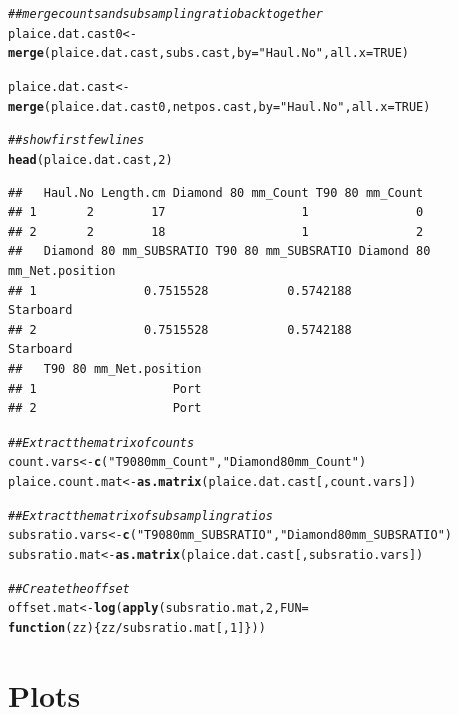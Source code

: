 \documentclass[12pt]{article}\usepackage[]{graphicx}\usepackage[]{color}
\makeatletter
\newcommand{\hlnum}[1]{\textcolor[rgb]{0.686,0.059,0.569}{#1}}%
\newcommand{\hlstr}[1]{\textcolor[rgb]{0.192,0.494,0.8}{#1}}%
\newcommand{\hlcom}[1]{\textcolor[rgb]{0.678,0.584,0.686}{\textit{#1}}}%
\newcommand{\hlopt}[1]{\textcolor[rgb]{0,0,0}{#1}}%
\newcommand{\hlstd}[1]{\textcolor[rgb]{0.345,0.345,0.345}{#1}}%
\newcommand{\hlkwa}[1]{\textcolor[rgb]{0.161,0.373,0.58}{\textbf{#1}}}%
\newcommand{\hlkwb}[1]{\textcolor[rgb]{0.69,0.353,0.396}{#1}}%
\newcommand{\hlkwc}[1]{\textcolor[rgb]{0.333,0.667,0.333}{#1}}%
\newcommand{\hlkwd}[1]{\textcolor[rgb]{0.737,0.353,0.396}{\textbf{#1}}}%
\newenvironment{kframe}{%
 \def\at@end@of@kframe{}%
 \ifinner\ifhmode%
  \def\at@end@of@kframe{\end{minipage}}%
  \begin{minipage}{\columnwidth}%
 \fi\fi%
 \def\FrameCommand##1{\hskip\@totalleftmargin \hskip-\fboxsep
 \colorbox{shadecolor}{##1}\hskip-\fboxsep
     \hskip-\linewidth \hskip-\@totalleftmargin \hskip\columnwidth}%
 \MakeFramed {\advance\hsize-\width
   \@totalleftmargin\z@ \linewidth\hsize
   \@setminipage}}%
 {\par\unskip\endMakeFramed%
 \at@end@of@kframe}
\newenvironment{knitrout}{}{} %
\makeatother
\begin{document}
\begin{knitrout}
\begin{kframe}
\begin{alltt}
\hlcom{## merge counts and subsampling ratio back together }
\hlstd{plaice.dat.cast0} \hlkwb{<-} \hlkwd{merge}\hlstd{(plaice.dat.cast, subs.cast,} \hlkwc{by} \hlstd{=} \hlstr{"Haul.No"}\hlstd{,} \hlkwc{all.x} \hlstd{=} \hlnum{TRUE}\hlstd{)}

\hlstd{plaice.dat.cast} \hlkwb{<-} \hlkwd{merge}\hlstd{(plaice.dat.cast0, netpos.cast,} \hlkwc{by} \hlstd{=} \hlstr{"Haul.No"}\hlstd{,} \hlkwc{all.x} \hlstd{=} \hlnum{TRUE}\hlstd{)}

\hlcom{## show first few lines}
\hlkwd{head}\hlstd{(plaice.dat.cast,} \hlnum{2}\hlstd{)}
\end{alltt}
\begin{verbatim}
##   Haul.No Length.cm Diamond 80 mm_Count T90 80 mm_Count
## 1       2        17                   1               0
## 2       2        18                   1               2
##   Diamond 80 mm_SUBSRATIO T90 80 mm_SUBSRATIO Diamond 80 mm_Net.position
## 1               0.7515528           0.5742188                  Starboard
## 2               0.7515528           0.5742188                  Starboard
##   T90 80 mm_Net.position
## 1                   Port
## 2                   Port
\end{verbatim}
\begin{alltt}
\hlcom{## Extract the matrix of counts}
\hlstd{count.vars} \hlkwb{<-} \hlkwd{c}\hlstd{(}\hlstr{"T90 80 mm_Count"}\hlstd{,} \hlstr{"Diamond 80 mm_Count"}\hlstd{)}
\hlstd{plaice.count.mat} \hlkwb{<-} \hlkwd{as.matrix}\hlstd{(plaice.dat.cast[, count.vars])}

\hlcom{## Extract the matrix of subsampling ratios}
\hlstd{subsratio.vars} \hlkwb{<-} \hlkwd{c}\hlstd{(}\hlstr{"T90 80 mm_SUBSRATIO"}\hlstd{,} \hlstr{"Diamond 80 mm_SUBSRATIO"}\hlstd{)}
\hlstd{subsratio.mat} \hlkwb{<-} \hlkwd{as.matrix}\hlstd{(plaice.dat.cast[, subsratio.vars])}

\hlcom{## Create the offset}
\hlstd{offset.mat} \hlkwb{<-} \hlkwd{log}\hlstd{(}\hlkwd{apply}\hlstd{(subsratio.mat,} \hlnum{2}\hlstd{,} \hlkwc{FUN} \hlstd{=}
                        \hlkwa{function}\hlstd{(}\hlkwc{zz}\hlstd{)\{zz}\hlopt{/}\hlstd{subsratio.mat[,}\hlnum{1}\hlstd{]\}))}
\end{alltt}
\end{kframe}
\end{knitrout}

\section{Plots}
\end{document}
